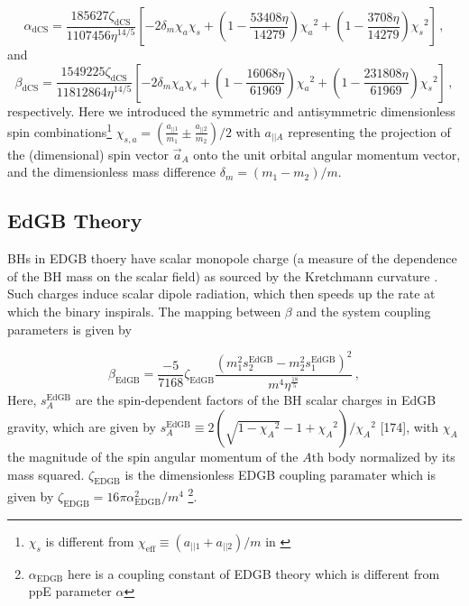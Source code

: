\documentclass[11pt]{article}
\begin{document}
 \begin{equation}
 \alpha_{\text{dCS}}=\frac{185627 \zeta_{\text{dCS}} }{1107456 \eta ^{14/5}}\left[-2 \text{$\delta_m$} \text{$\chi_a$} \text{$\chi_s$}+\left(1-\frac{53408 \eta }{14279}\right) \text{$\chi_a$}^2+\left(1-\frac{3708 \eta }{14279}\right) \text{$\chi_s$}^2\right]\,,
 \end{equation}
 and
 \begin{equation}
 \beta_{\text{dCS}}=\frac{1549225 \zeta_{\text{dCS}} }{11812864 \eta ^{14/5}}\left[-2 \text{$\delta_m$} \text{$\chi_a$} \text{$\chi_s$}+\left(1-\frac{16068 \eta }{61969}\right) \text{$\chi_a$}^2+\left(1-\frac{231808 \eta }{61969}\right) \text{$\chi_s$}^2\right]\,,
 \end{equation}
 respectively. Here we introduced the symmetric and antisymmetric dimensionless spin combinations\footnote{$\chi_s$ is different from $\chi_{\text{eff}}\equiv (a_{||1}+a_{||2})/m$ in \cite{TheLIGOScientific:2016wfe}} $\chi_{s,a}=(\frac{a_{||1}}{m_1}\pm\frac{a_{||2}}{m_2})/2$ with $a_{||A}$ representing the projection of the (dimensional) spin vector $\vec{a}_A$ onto the unit orbital angular momentum vector, and the dimensionless mass difference $\delta_m=(m_1-m_2)/m$.
 
 
  \subsection{EdGB Theory}
 BHs in EDGB thoery have scalar monopole charge (a measure of the dependence of the BH mass on the scalar field) as sourced by the Kretchmann curvature \cite{Yunes:2016jcc}. Such charges induce scalar dipole radiation, which then speeds up the rate at which the binary inspirals. The mapping between $\beta$ and the system coupling parameters is given by \cite{Yunes:2016jcc} \cite{Yagi:2011xp}
 
 \begin{equation}
 \beta_{\text{EdGB}}=\frac{-5}{7168}\zeta_{\text{EdGB}}\frac{(m_1^2s_2^{\text{EdGB}}-m_2^2s_1^{\text{EdGB}})^2}{m^4\eta^{\frac{18}{5}}}\,,
 \end{equation}
 Here, $s_{A}^{\text{EdGB}}$ are the spin-dependent factors of the BH scalar charges in EdGB gravity, which are given by $s_{A}^{\text{EdGB}}\equiv 2(\sqrt{1-{\chi_A}^2}-1+{\chi_A}^2)/{\chi_A}^2$ [174], with $\chi_A$ the magnitude of the spin angular momentum of the $\mathit{A}\text{th}$ body normalized by its mass squared. $\zeta_{\text{EDGB}}$ is the dimensionless EDGB coupling paramater which is given by $\zeta_{\text{EDGB}}=16 \pi \alpha_{\text{EDGB}}^2/m^4$ \footnote{$\alpha_{\text{EDGB}}$ here  is a coupling constant of EDGB theory which is different from ppE parameter $\alpha$}.
\end{document}
